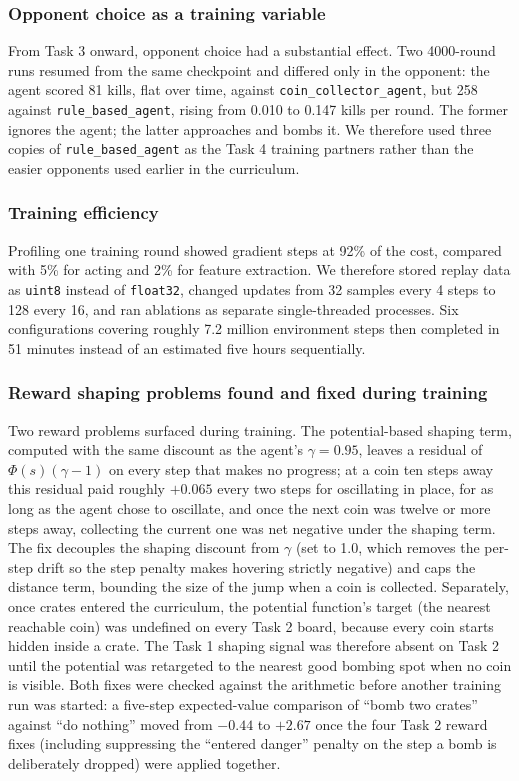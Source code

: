 \documentclass[11pt]{article}
\newcommand{\code}[1]{\texttt{#1}}
\begin{document}
\subsubsection{Opponent choice as a training variable}

From Task 3 onward, opponent choice had a substantial effect. Two 4000-round runs resumed
from the same checkpoint and differed only in the opponent: the agent scored 81 kills,
flat over time, against \code{coin\_collector\_agent}, but 258 against
\code{rule\_based\_agent}, rising from 0.010 to 0.147 kills per round. The former ignores
the agent; the latter approaches and bombs it. We therefore used three copies of
\code{rule\_based\_agent} as the Task 4 training partners rather than the easier opponents
used earlier in the curriculum.

\subsubsection{Training efficiency}

Profiling one training round showed gradient steps at 92\% of the cost, compared with 5\%
for acting and 2\% for feature extraction. We therefore stored replay data as \code{uint8}
instead of \code{float32}, changed updates from 32 samples every 4 steps to 128 every 16,
and ran ablations as separate single-threaded processes. Six configurations covering
roughly 7.2 million environment steps then completed in 51 minutes instead of an estimated
five hours sequentially.

\subsubsection{Reward shaping problems found and fixed during training}

Two reward problems surfaced during training. The potential-based shaping term, computed
with the same discount as the agent's $\gamma=0.95$, leaves a residual of
$\Phi(s)(\gamma-1)$ on every step that makes no progress; at a coin ten steps away this
residual paid roughly $+0.065$ every two steps for oscillating in place, for as long as the
agent chose to oscillate, and once the next coin was twelve or more steps away, collecting
the current one was net negative under the shaping term. The fix decouples the shaping
discount from $\gamma$ (set to 1.0, which removes the per-step drift so the step penalty
makes hovering strictly negative) and caps the distance term, bounding the size of the jump
when a coin is collected. Separately, once crates entered the curriculum, the potential
function's target (the nearest reachable coin) was undefined on every Task 2 board, because
every coin starts hidden inside a crate. The Task 1 shaping signal was therefore absent on
Task 2 until the potential was retargeted to the nearest good bombing spot when no coin is
visible. Both fixes were checked against the arithmetic before another training run was
started: a five-step expected-value comparison of ``bomb two crates'' against ``do nothing''
moved from $-0.44$ to $+2.67$ once the four Task 2 reward fixes (including suppressing the
``entered danger'' penalty on the step a bomb is deliberately dropped) were applied
together.
\end{document}
